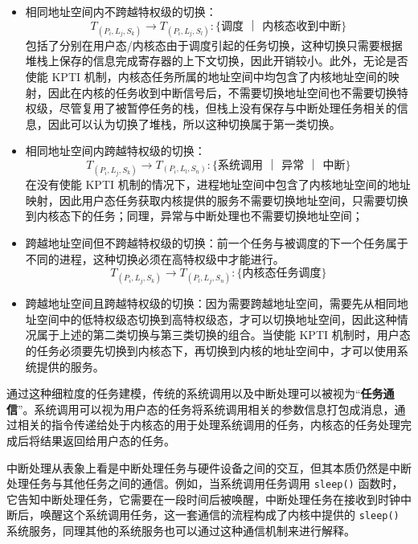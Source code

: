 \begin{itemize}
    \item 相同地址空间内不跨越特权级的切换：
    \begin{equation*}
        T_{(P_{i}, L_{j}, S_{k})} \longrightarrow T_{(P_{i}, L_{j}, S_{l})} : \{\text{调度 ｜ 内核态收到中断}\}
    \end{equation*}
    包括了分别在用户态/内核态由于调度引起的任务切换，这种切换只需要根据堆栈上保存的信息完成寄存器的上下文切换，因此开销较小。此外，无论是否使能 KPTI 机制，内核态任务所属的地址空间中均包含了内核地址空间的映射，因此在内核的任务收到中断信号后，不需要切换地址空间也不需要切换特权级，尽管复用了被暂停任务的栈，但栈上没有保存与中断处理任务相关的信息，因此可以认为切换了堆栈，所以这种切换属于第一类切换。

    \item 相同地址空间内跨越特权级的切换：
    \begin{equation*}
        T_{(P_{i}, L_{j}, S_{k})} \longrightarrow T_{(P_{i}, L_{l}, S_{n})} : \{\text{系统调用 ｜ 异常 ｜ 中断}\}
    \end{equation*}
    在没有使能 KPTI 机制的情况下，进程地址空间中包含了内核地址空间的地址映射，因此用户态任务获取内核提供的服务不需要切换地址空间，只需要切换到内核态下的任务；同理，异常与中断处理也不需要切换地址空间；
    
    \item 跨越地址空间但不跨越特权级的切换：前一个任务与被调度的下一个任务属于不同的进程，这种切换必须在高特权级中才能进行。
    \begin{equation*}
        T_{(P_{i}, L_{j}, S_{k})} \longrightarrow T_{(P_{l}, L_{j}, S_{n})} : \{\text{内核态任务调度}\}
    \end{equation*}

    \item 跨越地址空间且跨越特权级的切换：因为需要跨越地址空间，需要先从相同地址空间中的低特权级态切换到高特权级态，才可以切换地址空间，因此这种情况属于上述的第二类切换与第三类切换的组合。当使能 KPTI 机制时，用户态的任务必须要先切换到内核态下，再切换到内核的地址空间中，才可以使用系统提供的服务。
\end{itemize}

通过这种细粒度的任务建模，传统的系统调用以及中断处理可以被视为“\textbf{任务通信}”。系统调用可以视为用户态的任务将系统调用相关的参数信息打包成消息，通过相关的指令传递给处于内核态的用于处理系统调用的任务，内核态的任务处理完成后将结果返回给用户态的任务。

中断处理从表象上看是中断处理任务与硬件设备之间的交互，但其本质仍然是中断处理任务与其他任务之间的通信。例如，当系统调用任务调用 \verb|sleep()| 函数时，它告知中断处理任务，它需要在一段时间后被唤醒，中断处理任务在接收到时钟中断后，唤醒这个系统调用任务，这一套通信的流程构成了内核中提供的 \verb|sleep()| 系统服务，同理其他的系统服务也可以通过这种通信机制来进行解释。


